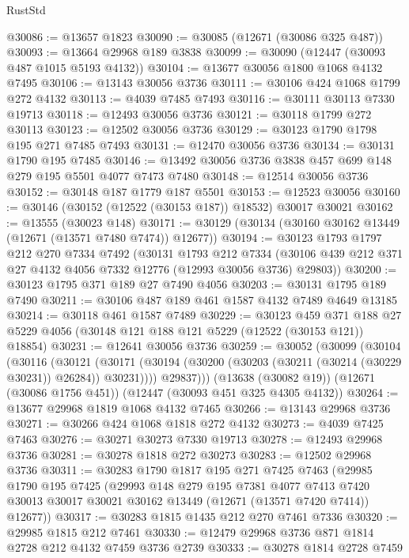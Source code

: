\begin{lexlean}{RustStd}
\begin{coremodule}
@30086 := @13657 @1823
@30090 := @30085 (@12671 (@30086 @325 @487))
@30093 := @13664 @29968 @189 @3838
@30099 := @30090 (@12447 (@30093 @487 @1015 @5193 @4132))
@30104 := @13677 @30056 @1800 @1068 @4132 @7495
@30106 := @13143 @30056 @3736
@30111 := @30106 @424 @1068 @1799 @272 @4132
@30113 := @4039 @7485 @7493
@30116 := @30111 @30113 @7330 @19713
@30118 := @12493 @30056 @3736
@30121 := @30118 @1799 @272 @30113
@30123 := @12502 @30056 @3736
@30129 := @30123 @1790 @1798 @195 @271 @7485 @7493
@30131 := @12470 @30056 @3736
@30134 := @30131 @1790 @195 @7485
@30146 := @13492 @30056 @3736 @3838 @457 @699 @148 @279 @195 @5501 @4077 @7473 @7480
@30148 := @12514 @30056 @3736
@30152 := @30148 @187 @1779 @187 @5501
@30153 := @12523 @30056
@30160 := @30146 (@30152 (@12522 (@30153 @187)) @18532) @30017 @30021
@30162 := @13555 (@30023 @148)
@30171 := @30129 (@30134 (@30160 @30162 @13449 (@12671 (@13571 @7480 @7474)) @12677))
@30194 := @30123
    @1793
    @1797
    @212
    @270
    @7334
    @7492
    (@30131
      @1793
      @212
      @7334
      (@30106 @439 @212 @371 @27 @4132 @4056 @7332 @12776 (@12993 @30056 @3736) @29803))
@30200 := @30123 @1795 @371 @189 @27 @7490 @4056
@30203 := @30131 @1795 @189 @7490
@30211 := @30106 @487 @189 @461 @1587 @4132 @7489 @4649 @13185
@30214 := @30118 @461 @1587 @7489
@30229 := @30123
    @459
    @371
    @188
    @27
    @5229
    @4056
    (@30148 @121 @188 @121 @5229 (@12522 (@30153 @121)) @18854)
@30231 := @12641 @30056 @3736
@30259 := @30052
    (@30099
      (@30104
        (@30116
          (@30121
            (@30171 (@30194 (@30200 (@30203 (@30211 (@30214 (@30229 @30231)) @26284)) @30231))))
          @29837)))
    (@13638 (@30082 @19))
    (@12671 (@30086 @1756 @451))
    (@12447 (@30093 @451 @325 @4305 @4132))
@30264 := @13677 @29968 @1819 @1068 @4132 @7465
@30266 := @13143 @29968 @3736
@30271 := @30266 @424 @1068 @1818 @272 @4132
@30273 := @4039 @7425 @7463
@30276 := @30271 @30273 @7330 @19713
@30278 := @12493 @29968 @3736
@30281 := @30278 @1818 @272 @30273
@30283 := @12502 @29968 @3736
@30311 := @30283
    @1790
    @1817
    @195
    @271
    @7425
    @7463
    (@29985
      @1790
      @195
      @7425
      (@29993
        @148
        @279
        @195
        @7381
        @4077
        @7413
        @7420
        @30013
        @30017
        @30021
        @30162
        @13449
        (@12671 (@13571 @7420 @7414))
        @12677))
@30317 := @30283 @1815 @1435 @212 @270 @7461 @7336
@30320 := @29985 @1815 @212 @7461
@30330 := @12479 @29968 @3736 @871 @1814 @2728 @212 @4132 @7459 @3736 @2739
@30333 := @30278 @1814 @2728 @7459

\end{coremodule}
\end{lexlean}
